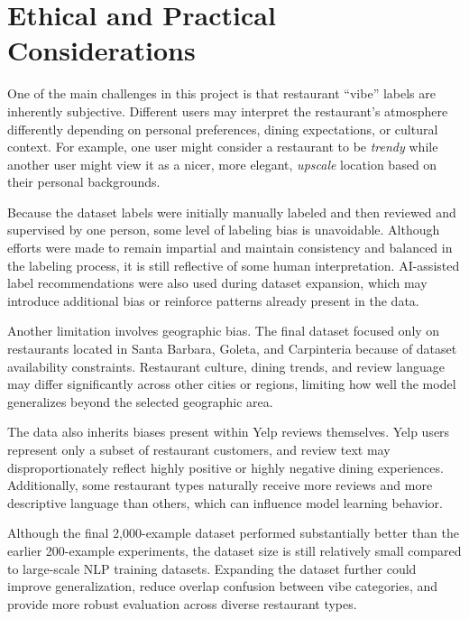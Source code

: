 \documentclass[11pt]{article}
\begin{document}
\section{Ethical and Practical Considerations}

One of the main challenges in this project is that restaurant ``vibe'' labels are inherently subjective. Different users may interpret the restaurant's atmosphere 
differently depending on personal preferences, dining expectations, or cultural context. For example, one user might consider a restaurant to be 
\textit{trendy} while another user might view it as a nicer, more elegant, \textit{upscale} location based on their personal backgrounds. 

\medbreak \noindent Because the dataset labels were initially manually labeled and then reviewed and supervised by one person, some level of labeling bias is unavoidable. 
Although efforts were made to remain impartial and maintain consistency and balanced in the labeling process, it is still reflective of some human interpretation. 
AI-assisted label recommendations were also used during dataset expansion, which may introduce additional bias or reinforce patterns already present in the data.

\medbreak \noindent Another limitation involves geographic bias. The final dataset focused only on restaurants located in Santa Barbara, Goleta, and Carpinteria because of 
dataset availability constraints. Restaurant culture, dining trends, and review language may differ significantly across other cities or regions, limiting how well the 
model generalizes beyond the selected geographic area.

\medbreak \noindent The data also inherits biases present within Yelp reviews themselves. Yelp users represent only a subset of restaurant customers, and review text may 
disproportionately reflect highly positive or highly negative dining experiences. Additionally, some restaurant types naturally receive more reviews and more descriptive 
language than others, which can influence model learning behavior.

\medbreak \noindent Although the final 2,000-example dataset performed substantially better than the earlier 200-example experiments, the dataset size is still relatively 
small compared to large-scale NLP training datasets. Expanding the dataset further could improve generalization, reduce overlap confusion between vibe categories, and 
provide more robust evaluation across diverse restaurant types.
\end{document}
